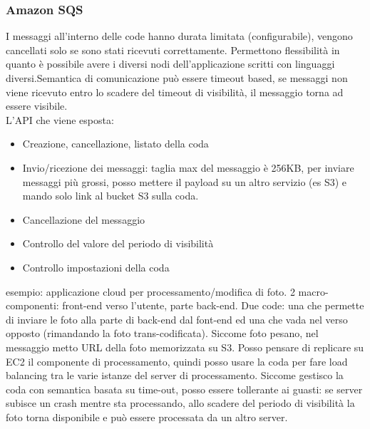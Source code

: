 \documentclass{article}
\begin{document}
\subsubsection{Amazon SQS}
I messaggi all'interno delle code hanno durata limitata (configurabile), vengono cancellati solo se sono stati ricevuti correttamente. Permettono flessibilità in quanto è possibile avere i diversi nodi dell'applicazione scritti con linguaggi diversi.Semantica di comunicazione può essere timeout based, se messaggi non viene ricevuto entro lo scadere del timeout di visibilità, il messaggio torna ad essere visibile.\\ L'API che viene esposta:
\begin{itemize}
\item Creazione, cancellazione, listato della coda
\item Invio/ricezione dei messaggi: taglia max del messaggio è 256KB, per inviare messaggi più grossi, posso mettere il payload su un altro servizio (es S3) e mando solo link al bucket S3 sulla coda.
\item Cancellazione del messaggio
\item Controllo del valore del periodo di visibilità
\item Controllo impostazioni della coda
\end{itemize}
esempio: applicazione cloud per processamento/modifica di foto. 2 macro-componenti: front-end verso l'utente, parte back-end. Due code: una che permette di inviare le foto alla parte di back-end dal font-end ed una che vada nel verso opposto (rimandando la foto trans-codificata). Siccome foto pesano, nel messaggio metto URL della foto memorizzata su S3. Posso pensare di replicare su EC2 il componente di processamento, quindi posso usare la coda per fare load balancing tra le varie istanze del server di processamento. Siccome gestisco la coda con semantica basata su time-out, posso essere tollerante ai guasti: se server subisce un crash mentre sta processando, allo scadere del periodo di visibilità la foto torna disponibile e può essere processata da un altro server.
\end{document}
